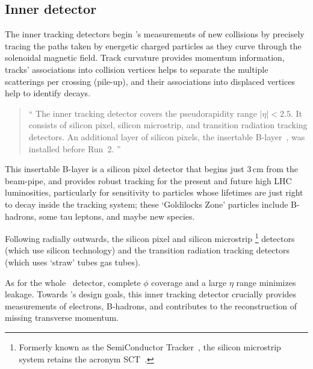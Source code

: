 \subsection{Inner detector}
\label{sec:atlas_inner}
The inner tracking detectors begin \atlas's measurements of new collisions
by precisely tracing the paths taken by energetic charged particles
as they curve through the solenoidal magnetic field.
Track curvature provides momentum information,
tracks' associations into collision vertices helps to separate the multiple
scatterings per crossing (pile-up),
and their associations into displaced vertices help to identify
decays.
\begin{quote}
``%
The inner tracking detector covers the pseudorapidity range $|\eta| < 2.5$.
It consists of silicon pixel, silicon microstrip, and transition radiation
tracking detectors.
An additional layer of silicon pixels, the insertable
B-layer~\cite{ATLAS-TDR-19, PIX-2018-001}, was installed before Run~2.%
''~\cite{atlas2022searches}
\end{quote}
This insertable B-layer is a silicon pixel detector that begins just
$3\,\textrm{cm}$ from the beam-pipe, and provides robust tracking for the
present and future high LHC luminosities,
particularly for sensitivity to particles whose lifetimes are just right to
decay inside the tracking system;
these `Goldilocks Zone' particles include B-hadrons, some tau leptons, and
maybe new species.

Following radially outwards, the silicon pixel and silicon microstrip%
\footnote{%
Formerly known as the SemiConductor Tracker~\cite{atlas1999design1},
the silicon microstrip system retains the acronym
SCT~\cite{atlas2008experiment}.%
}
detectors (which use silicon technology)
and the transition radiation tracking detectors (which uses `straw' tubes
gas tubes).

As for the whole \atlas\ detector, complete $\phi$ coverage and a large $\eta$
range minimizes leakage.
Towards \atlas's design goals, this inner tracking detector crucially provides
measurements of electrons, B-hadrons, and contributes to the reconstruction of
missing transverse momentum.


